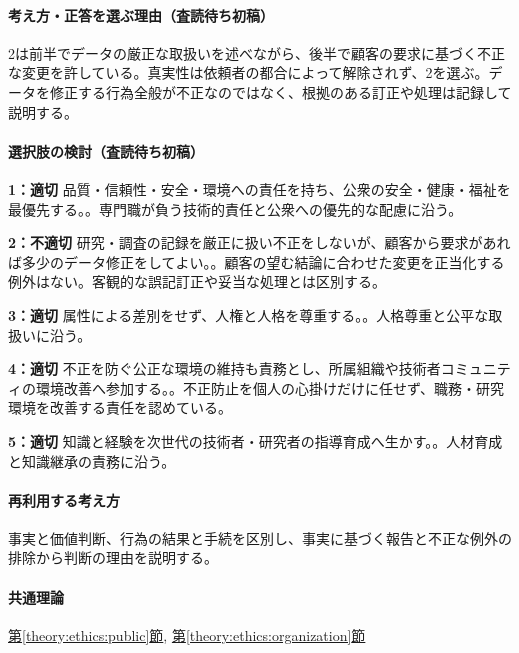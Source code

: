 \paragraph{考え方・正答を選ぶ理由（査読待ち初稿）} 2は前半でデータの厳正な取扱いを述べながら、後半で顧客の要求に基づく不正な変更を許している。真実性は依頼者の都合によって解除されず、2を選ぶ。データを修正する行為全般が不正なのではなく、根拠のある訂正や処理は記録して説明する。

\paragraph{選択肢の検討（査読待ち初稿）}\mbox{}\par

\noindent\textbf{1：適切} 品質・信頼性・安全・環境への責任を持ち、公衆の安全・健康・福祉を最優先する。。専門職が負う技術的責任と公衆への優先的な配慮に沿う。\par

\noindent\textbf{2：不適切} 研究・調査の記録を厳正に扱い不正をしないが、顧客から要求があれば多少のデータ修正をしてよい。。顧客の望む結論に合わせた変更を正当化する例外はない。客観的な誤記訂正や妥当な処理とは区別する。\par

\noindent\textbf{3：適切} 属性による差別をせず、人権と人格を尊重する。。人格尊重と公平な取扱いに沿う。\par

\noindent\textbf{4：適切} 不正を防ぐ公正な環境の維持も責務とし、所属組織や技術者コミュニティの環境改善へ参加する。。不正防止を個人の心掛けだけに任せず、職務・研究環境を改善する責任を認めている。\par

\noindent\textbf{5：適切} 知識と経験を次世代の技術者・研究者の指導育成へ生かす。。人材育成と知識継承の責務に沿う。\par

\paragraph{再利用する考え方} 事実と価値判断、行為の結果と手続を区別し、事実に基づく報告と不正な例外の排除から判断の理由を説明する。

\paragraph{共通理論} \hyperref[theory:ethics:public]{第\ref*{theory:ethics:public}節}, \hyperref[theory:ethics:organization]{第\ref*{theory:ethics:organization}節}


